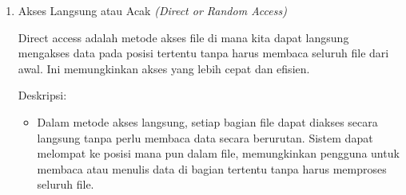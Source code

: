 \documentclass[12pt]{article}
\begin{document}
\begin{enumerate}
\begin{itemize}
    \end{itemize}

    {Kasus penggunaan:}
     \begin{itemize}
        \item Arsip

        \item Media file

        \item Sistem \textit{backup}: Penyimpanan data yang diakses atau dipulihkan secara berurutan.

    \end{itemize}

    {Kelebihan:}
     \begin{itemize}
        \item Sederhana: Metode ini mudah diimplementasikan dan ideal untuk penggunaan di mana urutan data penting.


        \item Kinerja: Dapat memberikan kinerja yang baik untuk aplikasi yang membaca atau menulis seluruh file dari awal hingga akhir.
    \end{itemize}

    {Kekurangan:}
     \begin{itemize}
        \item Tidak Fleksibel: Untuk mengakses data di tengah file, seluruh bagian sebelumnya harus dilewati, membuat akses menjadi lambat untuk file besar.

        \item Tidak efisien: Untuk aplikasi yang memerlukan pengambilan data secara acak, metode ini tidak efisien.

    \end{itemize}

    
\item  Akses Langsung atau Acak \textit{(Direct or Random Access)}

Direct access adalah metode akses file di mana kita dapat langsung mengakses data pada posisi tertentu tanpa harus membaca seluruh file dari awal. Ini memungkinkan akses yang lebih cepat dan efisien.

    {Deskripsi:}
    \begin{itemize}
        \item Dalam metode akses langsung, setiap bagian file dapat diakses secara langsung tanpa perlu membaca data secara berurutan. Sistem dapat melompat ke posisi mana pun dalam file, memungkinkan pengguna untuk membaca atau menulis data di bagian tertentu tanpa harus memproses seluruh file.


\end{itemize}
\end{enumerate}
\end{document}
